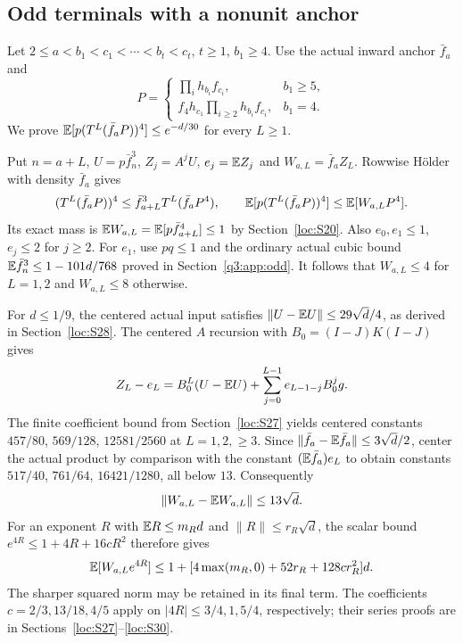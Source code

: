 \subsection{Odd terminals with a nonunit anchor}\label{loc:S32}
Let $2\le a<b_1<c_1<\cdots<b_t<c_t$, $t\ge1$, $b_1\ge4$.
Use the actual inward anchor $\bar f_{a}$ and
\[
 P=\begin{cases}\prod_{i} h_{b_i}f_{c_i},&b_1\ge5,\\
 f_4h_{c_1}\prod_{i\ge2}h_{b_i}f_{c_i},&b_1=4.
 \end{cases}
\]
We prove $\mathbb E[p(T^L(\bar f_{a}P))^4]\le e^{-d/30}$ for every $L\ge1$.

Put $n=a+L$, $U=p\bar f_{n}^3$, $Z_j=A^jU$, $e_j=\mathbb E Z_j$ and
$W_{a,L}=\bar f_{a}Z_L$. Rowwise H\"older with density $\bar f_{a}$ gives
\begin{equation}\label{eq:compact-anchor-weight}
 (T^L(\bar f_{a}P))^4\le \bar f_{a+L}^3T^L(\bar f_{a}P^4),\qquad
 \mathbb E[p(T^L(\bar f_{a}P))^4]\le\mathbb E[W_{a,L}P^4].
\end{equation}
Its exact mass is $\mathbb E W_{a,L}=\mathbb E[p\bar f_{a+L}^4]\le1$ by
Section~\ref{loc:S20}. Also $e_0,e_1\le1$, $e_j\le2$ for $j\ge2$.
For $e_1$, use $pq\le1$ and the ordinary actual cubic bound
$\mathbb E \bar f_{n}^3\le1-101d/768$ proved in Section~\ref{q3:app:odd}.
It follows that $W_{a,L}\le4$ for $L=1,2$ and $W_{a,L}\le8$ otherwise.

For $d\le1/9$, the centered actual input satisfies
$\|U-\mathbb E U\|\le29\sqrt d/4$, as derived in
Section~\ref{loc:S28}. The centered $A$ recursion with
$B_0=(I-J)K(I-J)$ gives
\[
 Z_L-e_L=B_0^L(U-\mathbb E U)+\sum_{j=0}^{L-1}e_{L-1-j}B_0^jg.
\]
The finite coefficient bound from Section~\ref{loc:S27} yields centered
constants $457/80$, $569/128$, $12581/2560$ at $L=1,2,\ge3$.
Since $\|\bar f_{a}-\mathbb E \bar f_{a}\|\le3\sqrt d/2$, center the actual product by
comparison with the constant $(\mathbb E \bar f_{a})e_L$ to obtain constants
$517/40$, $761/64$, $16421/1280$, all below $13$.
Consequently
\begin{equation}\label{eq:compact-anchor-budget}
 \|W_{a,L}-\mathbb E W_{a,L}\|\le13\sqrt d.
\end{equation}
For an exponent $R$ with $\mathbb E R\le m_Rd$ and $\|R\|\le r_R\sqrt d$,
the scalar bound $e^{4R}\le1+4R+16cR^2$ therefore gives
\[
 \mathbb E[W_{a,L}e^{4R}]\le1+[4\max(m_R,0)+52r_R+128cr_R^2]d.
\]
The sharper squared norm may be retained in its final term.
The coefficients $c=2/3,13/18,4/5$ apply on
$|4R|\le3/4,1,5/4$, respectively; their series proofs are in
Sections~\ref{loc:S27}--\ref{loc:S30}.

